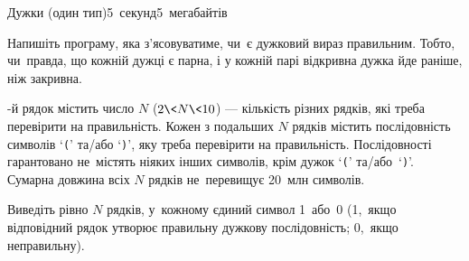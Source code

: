 ﻿\begin{problem}{Дужки (один тип)}{\stdinOrInputTxt}{\stdoutOrOutputTxt}{5~секунд}{5~мегабайтів}

Напишіть програму, яка з'ясовуватиме, чи~є дужковий вираз правильним. Тобто, чи~правда, що кожній дужці є парна, і у кожній парі відкривна дужка йде раніше, ніж закривна.

-й рядок містить число $N$ ($2{\<}N{\<}10$) --- кількість різних рядків, які треба перевірити на правильність. Кожен з подальших $N$ рядків містить послідовність символів `\texttt{(}' та/або `\texttt{)}', яку треба перевірити на правильність. Послідовності гарантовано не~містять ніяких інших символів, крім дужок `\texttt{(}' та/або~`\texttt{)}'. Сумарна довжина всіх $N$ рядків не~перевищує 20~млн символів.

\OutputFile
Виведіть рівно $N$ рядків, у~кожному єдиний символ 1~або~0 (1,~якщо відповідний рядок утворює правильну дужкову послідовність; 0,~якщо неправильну).

\Example

\begin{example}
%
\end{example}



\end{problem}